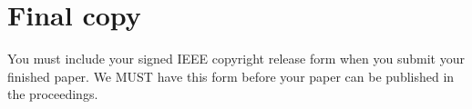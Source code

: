 \documentclass[10pt,twocolumn,letterpaper]{article}
\begin{document}
\section{Final copy}

You must include your signed IEEE copyright release form when you submit 
your finished paper. We MUST have this form before your paper can be 
published in the proceedings.


{\small


}

\newpage
\rule{0pt}{1pt}\newpage
\rule{0pt}{1pt}\newpage
\rule{0pt}{1pt}\newpage
\rule{0pt}{1pt}\newpage
\rule{0pt}{1pt}\newpage
\rule{0pt}{1pt}\newpage
\rule{0pt}{1pt}\newpage
\rule{0pt}{1pt}\newpage
\end{document}
